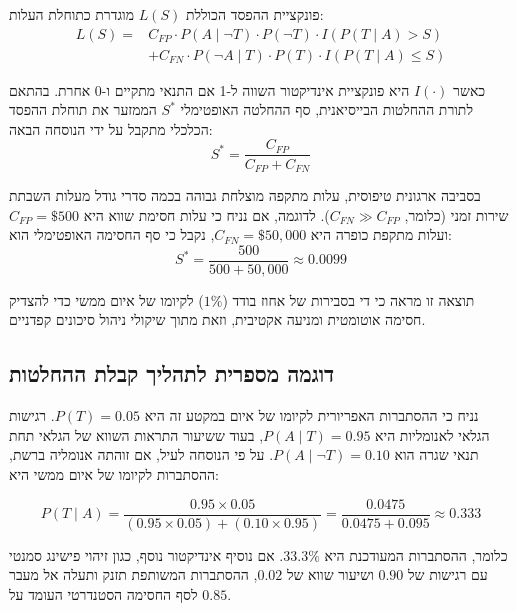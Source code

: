 \documentclass[11pt,a4paper]{article}
\begin{document}
פונקציית ההפסד הכוללת $L(S)$ מוגדרת כתוחלת העלות:
\begin{equation}
\begin{split}
L(S) = & C_{FP} \cdot P(A \mid \neg T) \cdot P(\neg T) \cdot I(P(T \mid A) > S) \\
& + C_{FN} \cdot P(\neg A \mid T) \cdot P(T) \cdot I(P(T \mid A) \le S)
\end{split}
\end{equation}

כאשר $I(\cdot)$ היא פונקציית אינדיקטור השווה ל-1 אם התנאי מתקיים ו-0 אחרת. בהתאם לתורת ההחלטות הבייסיאנית, סף ההחלטה האופטימלי $S^*$ הממזער את תוחלת ההפסד הכלכלי מתקבל על ידי הנוסחה הבאה:
\begin{equation}
S^* = \frac{C_{FP}}{C_{FP} + C_{FN}}
\label{eq:optimal_threshold}
\end{equation}

בסביבה ארגונית טיפוסית, עלות מתקפה מוצלחת גבוהה בכמה סדרי גודל מעלות השבתת שירות זמני (כלומר, $C_{FN} \gg C_{FP}$). לדוגמה, אם נניח כי עלות חסימת שווא היא $C_{FP} = \$500$ ועלות מתקפת כופרה היא $C_{FN} = \$50,000$, נקבל כי סף החסימה האופטימלי הוא:
\begin{equation}
S^* = \frac{500}{500 + 50,000} \approx 0.0099
\end{equation}

תוצאה זו מראה כי די בסבירות של אחוז בודד ($1\%$) לקיומו של איום ממשי כדי להצדיק חסימה אוטומטית ומניעה אקטיבית, וזאת מתוך שיקולי ניהול סיכונים קפדניים.

\subsection{דוגמה מספרית לתהליך קבלת ההחלטות}
נניח כי ההסתברות האפריורית לקיומו של איום במקטע זה היא $P(T) = 0.05$. רגישות הגלאי לאנומליות היא $P(A \mid T) = 0.95$, בעוד ששיעור התראות השווא של הגלאי תחת תנאי שגרה הוא $P(A \mid \neg T) = 0.10$. 
על פי הנוסחה לעיל, אם זוהתה אנומליה ברשת, ההסתברות לקיומו של איום ממשי היא:

\begin{equation}
P(T \mid A) = \frac{0.95 \times 0.05}{(0.95 \times 0.05) + (0.10 \times 0.95)} = \frac{0.0475}{0.0475 + 0.095} \approx 0.333
\end{equation}

כלומר, ההסתברות המעודכנת היא $33.3\%$. אם נוסיף אינדיקטור נוסף, כגון זיהוי פישינג סמנטי עם רגישות של $0.90$ ושיעור שווא של $0.02$, ההסתברות המשותפת תזנק ותעלה אל מעבר לסף החסימה הסטנדרטי העומד על $0.85$.

\end{document}
